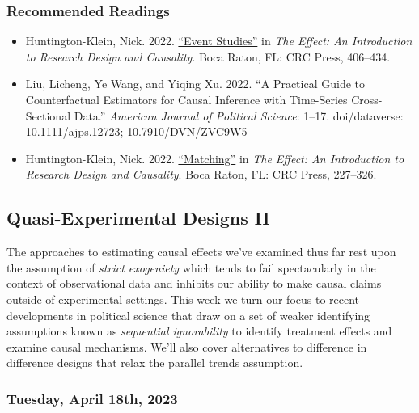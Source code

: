 \documentclass[12pt,]{article}
\begin{document}
\hypertarget{recommended-readings-9}{%
\subsubsection{Recommended Readings}\label{recommended-readings-9}}

\begin{itemize}
\item
  Huntington-Klein, Nick. 2022.
  \href{https://theeffectbook.net/ch-EventStudies.html}{``Event
  Studies''} in \emph{The Effect: An Introduction to Research Design and
  Causality}. Boca Raton, FL: CRC Press, 406--434.
\item
  Liu, Licheng, Ye Wang, and Yiqing Xu. 2022. ``A Practical Guide to
  Counterfactual Estimators for Causal Inference with Time-Series
  Cross-Sectional Data.'' \emph{American Journal of Political Science}:
  1--17. doi/dataverse:
  \href{https://doi.org/10.1111/ajps.12723}{10.1111/ajps.12723};
  \href{https://doi.org/10.7910/DVN/ZVC9W5}{10.7910/DVN/ZVC9W5}
\item
  Huntington-Klein, Nick. 2022.
  \href{https://theeffectbook.net/ch-Matching.html}{``Matching''} in
  \emph{The Effect: An Introduction to Research Design and Causality}.
  Boca Raton, FL: CRC Press, 227--326.
\end{itemize}

\hypertarget{quasi-experimental-designs-ii}{%
\subsection{Quasi-Experimental Designs
II}\label{quasi-experimental-designs-ii}}

\noindent The approaches to estimating causal effects we've examined
thus far rest upon the assumption of \emph{strict exogeniety} which
tends to fail spectacularly in the context of observational data and
inhibits our ability to make causal claims outside of experimental
settings. This week we turn our focus to recent developments in
political science that draw on a set of weaker identifying assumptions
known as \emph{sequential ignorability} to identify treatment effects
and examine causal mechanisms. We'll also cover alternatives to
difference in difference designs that relax the parallel trends
assumption.

\hypertarget{tuesday-april-18th-2023}{%
\subsubsection{Tuesday, April 18th,
2023}\label{tuesday-april-18th-2023}}
\end{document}
